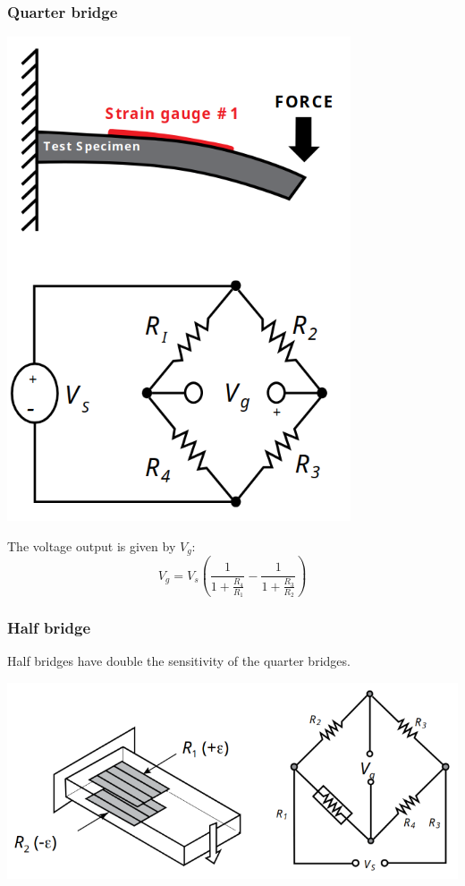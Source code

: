 \documentclass[11pt]{article}
\begin{document}
\subsubsection{Quarter bridge}
\label{sec:orga9c3a77}
\begin{center}
\includegraphics[width=.9\linewidth]{./images/quarter-bridge-deflection-bridge.png}
\end{center}

The voltage output is given by \(V_g\):
\[V_g = V_s \left(\frac{1}{1 + \frac{R_4}{R_1}} - \frac{1}{1 + \frac{R_3}{R_2}} \right)\]

\subsubsection{Half bridge}
\label{sec:org157e6f0}
Half bridges have double the sensitivity of the quarter bridges.
\begin{center}
\includegraphics[width=.9\linewidth]{./images/half-bridge-deflection-bridge.png}
\end{center}
\end{document}
